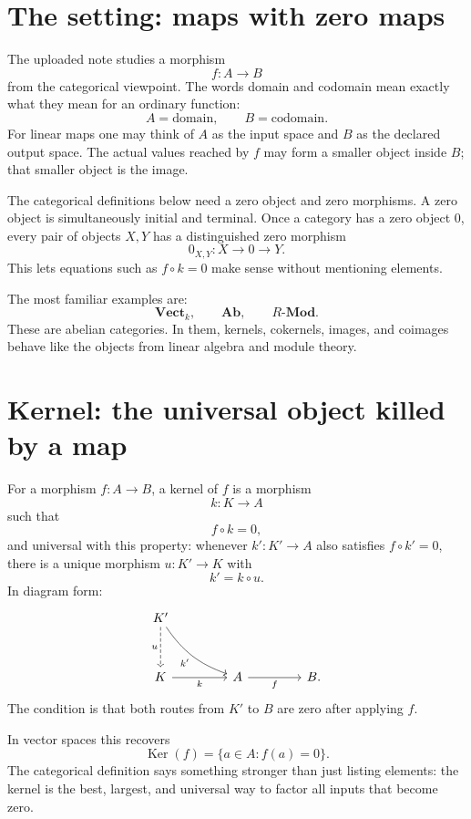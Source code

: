 
\section{The setting: maps with zero maps}

The uploaded note studies a morphism
\[
  f:A\to B
\]
from the categorical viewpoint.  The words domain and codomain mean exactly what they mean for an ordinary function:
\[
  A=\text{domain},\qquad B=\text{codomain}.
\]
For linear maps one may think of \(A\) as the input space and \(B\) as the declared output space.  The actual values reached by \(f\) may form a smaller object inside \(B\); that smaller object is the image.

The categorical definitions below need a zero object and zero morphisms.  A zero object is simultaneously initial and terminal.  Once a category has a zero object \(0\), every pair of objects \(X,Y\) has a distinguished zero morphism
\[
  0_{X,Y}:X\to 0\to Y.
\]
This lets equations such as \(f\circ k=0\) make sense without mentioning elements.

The most familiar examples are:
\[
  \mathbf{Vect}_k,\qquad \mathbf{Ab},\qquad R\text{-}\mathbf{Mod}.
\]
These are abelian categories.  In them, kernels, cokernels, images, and coimages behave like the objects from linear algebra and module theory.

\section{Kernel: the universal object killed by a map}

For a morphism \(f:A\to B\), a kernel of \(f\) is a morphism
\[
  k:K\to A
\]
such that
\[
  f\circ k=0,
\]
and universal with this property: whenever \(k':K'\to A\) also satisfies \(f\circ k'=0\), there is a unique morphism \(u:K'\to K\) with
\[
  k'=k\circ u.
\]
In diagram form:
\[
\begin{tikzcd}[column sep=4.2em,row sep=3.2em]
K' \arrow[dr, "k'"', bend right=18] \arrow[d, dashed, "u"'] & \\
K \arrow[r, "k"'] & A \arrow[r, "f"'] & B .
\end{tikzcd}
\]
The condition is that both routes from \(K'\) to \(B\) are zero after applying \(f\).

In vector spaces this recovers
\[
  \operatorname{Ker}(f)=\{a\in A:f(a)=0\}.
\]
The categorical definition says something stronger than just listing elements: the kernel is the best, largest, and universal way to factor all inputs that become zero.

